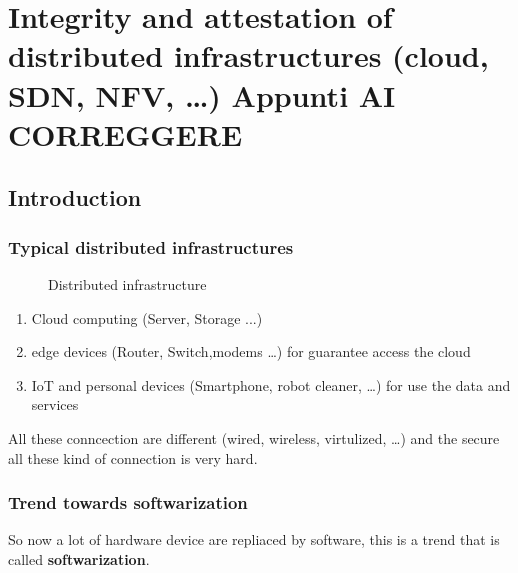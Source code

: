 
\chapter{Integrity and attestation of distributed infrastructures (cloud, SDN, NFV, …) \textbf{Appunti AI CORREGGERE}}

\section{Introduction}

\subsection{Typical distributed infrastructures}

\begin{figure}[h]
    \centering
    \caption{Distributed infrastructure}
    \label{fig:distributed_infrastructure}
\end{figure}


\begin{enumerate}[itemsep=0pt]
    \item Cloud computing (Server, Storage ...)
    \item edge devices (Router, Switch,modems  \dots) for guarantee access the cloud
    \item IoT and personal devices (Smartphone, robot cleaner,  \dots) for use the data and services
\end{enumerate}

All these conncection are different (wired, wireless, virtulized, \dots) and the secure all these kind of connection is very hard.

\subsection{Trend towards softwarization}

So now a lot of hardware device are repliaced by software, this is a trend that is called \textbf{softwarization}.

